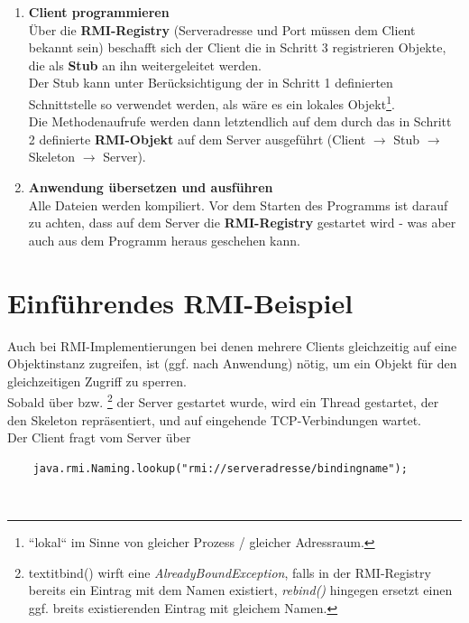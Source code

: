 \begin{enumerate}
    \item \textbf{Client programmieren}\\
    \noindent
    Über die \textbf{RMI-Registry} (Serveradresse und Port müssen dem Client bekannt sein) beschafft sich der Client die in Schritt 3 registrieren Objekte, die als \textbf{Stub} an ihn weitergeleitet werden.\\
    \noindent
    Der Stub kann unter Berücksichtigung der in Schritt 1 definierten Schnittstelle so verwendet werden, als wäre es ein lokales Objekt\footnote{
    ``lokal`` im Sinne von gleicher Prozess / gleicher Adressraum.
    }.\\
    \noindent
    Die Methodenaufrufe werden dann letztendlich auf dem durch das in Schritt 2 definierte \textbf{RMI-Objekt} auf dem Server ausgeführt (Client $\rightarrow$ Stub $\rightarrow$ Skeleton $\rightarrow$ Server).

    \item \textbf{Anwendung übersetzen und ausführen}\\
    \noindent
    Alle Dateien werden kompiliert.
    Vor dem Starten des Programms ist darauf zu achten, dass auf dem Server die \textbf{RMI-Registry} gestartet wird - was aber auch aus dem Programm heraus geschehen kann.
\end{enumerate}

\section{Einführendes RMI-Beispiel}\label{sec:rmiintro}

Auch bei RMI-Implementierungen bei denen mehrere Clients gleichzeitig auf eine Objektinstanz zugreifen, ist (ggf. nach Anwendung)  nötig, um ein Objekt für den gleichzeitigen Zugriff zu sperren.\\

\noindent
Sobald über  bzw. \footnote{
textit{bind()} wirft eine \textit{AlreadyBoundException}, falls in der RMI-Registry bereits ein Eintrag mit dem Namen existiert, \textit{rebind()} hingegen ersetzt einen ggf. breits existierenden Eintrag mit gleichem Namen.
} der Server gestartet wurde, wird ein Thread gestartet, der den Skeleton repräsentiert, und auf eingehende TCP-Verbindungen wartet.\\

\noindent
Der Client fragt vom Server über

\begin{verbatim}
    java.rmi.Naming.lookup("rmi://serveradresse/bindingname");
\end{verbatim}\\

